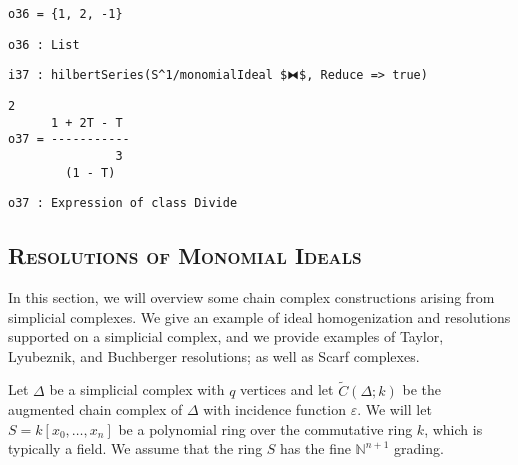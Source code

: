 \documentclass[12pt,leqno]{amsart}
\theoremstyle{definition}
\begin{document}
\begin{lstlisting}[xleftmargin=10pt, aboveskip=1.5pt, belowskip=1.5pt]
o36 = {1, 2, -1}
\end{lstlisting}
\begin{lstlisting}[xleftmargin=10pt, aboveskip=1.5pt, belowskip=1.5pt]
o36 : List
\end{lstlisting}
\begin{lstlisting}[xleftmargin=10pt, aboveskip=1.5pt, belowskip=1.5pt]
i37 : hilbertSeries(S^1/monomialIdeal $⧓$, Reduce => true)
\end{lstlisting}
\begin{lstlisting}[xleftmargin=10pt, lineskip=-10pt, aboveskip=4pt, belowskip=1pt]
                2
      1 + 2T - T
o37 = -----------
               3
        (1 - T)
\end{lstlisting}
\begin{lstlisting}[xleftmargin=10pt, aboveskip=1.5pt, belowskip=-5.0pt]
o37 : Expression of class Divide
\end{lstlisting}


\subsection*{\scshape\mdseries Resolutions of Monomial Ideals}

In this section, we will overview
some chain complex constructions arising from simplicial complexes. We give an
example of ideal homogenization and resolutions supported on a simplicial
complex, and we provide examples of Taylor, Lyubeznik, and Buchberger
resolutions; as well as Scarf complexes.

Let $\Delta$ be a simplicial complex with $q$ vertices and let
$\widetilde C(\Delta;k)$ be the augmented chain complex of $\Delta$ with
incidence function $\varepsilon$. We will let $S = k[x_0,\dotsc,x_n]$ be a
polynomial ring over the commutative ring $k$, which is typically a field. We
assume that the ring $S$ has the fine $\mathbb N^{n+1}$ grading.
\end{document}
